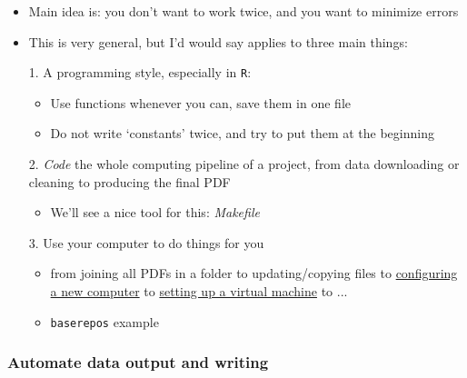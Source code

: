\documentclass[utf8, xcolor=dvipsnames, handout]{beamer}
\begin{document}
\begin{itemize}
\begin{frame}
\begin{itemize}[<+->]
  \item Main idea is: you don't want to work twice, and you want to minimize errors
  \item This is very general, but I'd would say applies to three main things:
  \item[1.] A programming style, especially in \texttt{R}:
  \begin{itemize}
    \item Use functions whenever you can, save them in one file
    \item Do not write `constants' twice, and try to put them at the beginning
  \end{itemize}
  \item[2.] \textit{Code} the whole computing pipeline of a project, from data downloading or cleaning to producing the final PDF
  \begin{itemize}
    \item We'll see a nice tool for this: \textit{Makefile}
  \end{itemize}
  \item[3.] Use your computer to do things for you
  \begin{itemize}
    \item from joining all PDFs in a folder to updating/copying files to \href{https://github.com/franvillamil/franvillamil.github.io/blob/master/post_setting_up_macos.md}{configuring a new computer} to \href{https://github.com/franvillamil/franvillamil.github.io/blob/master/post_R_google_cloud.md}{setting up a virtual machine} to ...
    \item \texttt{baserepos} example
  \end{itemize}
\end{itemize}

\end{frame}

\begin{frame}
\frametitle{Automate data output and writing}
\centering


\end{frame}
\end{itemize}
\end{document}
